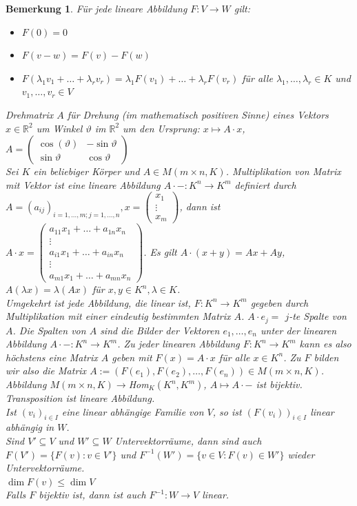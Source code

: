 \documentclass[12pt,a4paper]{article}
\theoremstyle{plain}
\newtheorem{Bemerkung}[Theorem]{Bemerkung}
\newcommand{\R}{\mathbb{R}}
\numberwithin{equation}{section}
\begin{document}
\begin{Bemerkung}
Für jede lineare Abbildung $F:V \rightarrow W$ gilt: 
\begin{itemize}
\item $F(0)=0$
\item $F(v-w)=F(v)-F(w)$
\item $F(\lambda_1 v_1+\ldots + \lambda_r v_r )=\lambda_1 F(v_1)+\ldots+\lambda_r F(v_r)$ für alle $\lambda_1,\ldots,\lambda_r \in K$ und $v_1,\ldots, v_r\in V$
\end{itemize}
Drehmatrix $A$ für Drehung (im mathematisch positiven Sinne) eines Vektors $x\in \R^2$ um Winkel $\vartheta$ im $\R^2$ um den Ursprung: $x \mapsto A\cdot x$, $A=\left(\begin{matrix} \cos(\vartheta) & -\sin\vartheta \\ \sin\vartheta & \cos\vartheta \end{matrix}\right)$ \\
Sei $K$ ein beliebiger Körper und $A\in M(m\times n, K)$. Multiplikation von Matrix mit Vektor ist eine lineare Abbildung $A\cdot - : K^n\rightarrow K^m$ definiert durch $A=(a_{ij})_{i=1,\ldots,m; j=1,\ldots,n}, x=\left(\begin{array}{c}x_1 \\ \vdots \\ x_m\end{array} \right)$, dann ist $A\cdot x=\left(\begin{array}{c} a_{11}x_1+\ldots+a_{1n}x_n \\ \vdots \\a_{i1}x_1+\ldots+a_{in}x_n\\ \vdots \\ a_{m1}x_1+\ldots+a_{mn}x_n \end{array} \right)$. Es gilt $A\cdot (x+y)=Ax+Ay$, $A(\lambda x)=\lambda (Ax)$ für $x,y\in K^n, \lambda \in K$. \\
Umgekehrt ist jede Abbildung, die linear ist, $F: K^n \rightarrow K^m$ gegeben durch Multiplikation mit einer eindeutig bestimmten Matrix $A$. $A\cdot e_j=$ $j$-te Spalte von $A$. Die Spalten von $A$ sind die Bilder der Vektoren $e_1,\ldots,e_n$ unter der linearen Abbildung $A\cdot - :K^n \rightarrow K^m$. Zu jeder linearen Abbildung $F:K^n\rightarrow K^m$ kann es also höchstens eine Matrix $A$ geben mit $F(x)=A\cdot x$ für alle $x\in K^n$. Zu $F$ bilden wir also die Matrix $A:=(F(e_1),F(e_2),\ldots,F(e_n))\in M(m\times n, K)$. Abbildung $M(m\times n, K) \rightarrow $Hom$_K(K^n, K^m)$, $A\mapsto A\cdot - $ ist bijektiv.\\
Transposition ist lineare Abbildung.\\
Ist  $(v_i)_{i\in I}$ eine linear abhängige Familie von $V$, so ist $(F(v_i))_{i\in I}$ linear abhängig in $W$.\\
Sind $V' \subseteq V$ und $W'\subseteq W$ Untervektorräume, dann sind auch $F(V')=\{F(v):v\in V'\}$ und $F^{-1}(W')=\{v\in V:F(v)\in W'\}$ wieder Untervektorräume.\\
$\dim F(v)\leq \dim V$ \\
Falls $F$ bijektiv ist, dann ist auch $F^{-1}: W\rightarrow V$ linear.
\end{Bemerkung}
\end{document}
